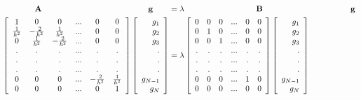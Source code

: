 \begin{align}
{\bf A}~~~~~~~~~~~~~~~~~~~~~~~~~~~~~~~~~~~~~~~~{\bf g} \qquad
& = \lambda ~~~~~~~~~~~~~~~~~~~~~~~~~~~{\bf B}
~~~~~~~~~~~~~~~~~~~~~~~~~~~~~~~~~{\bf g}
\nonumber \\
\left[
\begin{array}{cccccc}
1 & 0 & 0 &  ...  & 0 & 0 \\
{1 \over h^2} & -{2 \over h^2}  & {1 \over h^2} &  ...  & 0 & 0 \\
0 & {1 \over h^2} & -{2 \over h^2}  &  ...  & 0 & 0 \\
. & . & . &  ...  & . & . \\
. & . & . &  ...  & . & . \\
. & . & . &  ...  & . & . \\
0 & 0 & 0 &  ... &-{2 \over h^2}  & {1 \over h^2} \\
0 & 0 & 0 &  ...  & 0 & 1 \\
\end{array}
\right]
\left[
\begin{array}{r}
g_1 \\
g_2 \\
g_3  \\
.   \\
.   \\
.   \\
g_{N-1}  \\
g_N
\end{array}
\right]
&= \lambda
\left[
\begin{array}{cccccc}
0 & 0 & 0 &  ...  & 0 & 0 \\
0 & 1 & 0 &  ...  & 0 & 0 \\
0 & 0 & 1 &  ...  & 0 & 0 \\
. & . & . &  ...  & . & . \\
. & . & . &  ...  & . & . \\
. & . & . &  ...  & . & . \\
0 & 0 & 0 &  ...  & 1 &0 \\
0 & 0 & 0 &  ...  & 0 & 0 \\
\end{array}
\right]
\left[
\begin{array}{r}
g_1 \\
g_2 \\
g_3 \\
.  \\
.  \\
.  \\
g_{N-1} \\
g_N
\end{array}
\right]
\label{geneigenmatrix}
\end{align}

